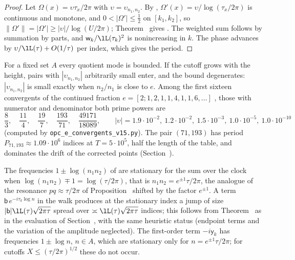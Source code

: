 \begin{proof}
Let $\Omega(x)=\upsilon\tau_x/2\pi$ with $\upsilon=\upsilon_{n_1,n_2}$. By , $\Omega'(x)=\upsilon/\log(\tau_x/2\pi)$ is continuous and monotone, and $0<|\Omega'|\le\frac12$ on $[k_1,k_2]$, so $\|\Omega'\|=|\Omega'|\ge|\upsilon|/\log(U/2\pi)$; Theorem~ gives . The weighted sum follows by summation by parts, and $\mathsf w_k/\lL(\tau_k)^2$ is nonincreasing in $k$. The phase advances by $\upsilon/\lL(\tau)+O(1/\tau)$ per index, which gives the period.
\end{proof}

For a fixed set $A$ every quotient mode is bounded. If the cutoff grows with the height, pairs with $|\upsilon_{n_1,n_2}|$ arbitrarily small enter, and the bound degenerates: $|\upsilon_{n_1,n_2}|$ is small exactly when $n_2/n_1$ is close to $e$. Among the first sixteen convergents of the continued fraction $e=[2;1,2,1,1,4,1,1,6,\dots]$ \cite{Olds1970}, those with numerator and denominator both prime powers are
\begin{equation}
\frac83,\quad\frac{11}4,\quad\frac{19}7,\quad\frac{193}{71},\quad\frac{49171}{18089},\qquad |\upsilon|=1.9\cdot10^{-2},\ 1.2\cdot10^{-2},\ 1.5\cdot10^{-3},\ 1.0\cdot10^{-5},\ 1.0\cdot10^{-10}
\label{eq:e_convergents}
\end{equation}
(computed by \texttt{opc\_e\_convergents\_v15.py}). The pair $(71,193)$ has period $P_{71,193}\approx1.09\cdot10^6$ indices at $T=5\cdot10^5$, half the length of the table, and dominates the drift of the corrected points (Section~).

\begin{remark}\label{rem:product_modes}
The frequencies $1\pm\log(n_1n_2)$ of  are stationary for the sum over the clock when $\log(n_1n_2)\mp1=\log(\tau/2\pi)$, that is $n_1n_2=e^{\pm1}\tau/2\pi$, the analogue of the resonance $pq\approx\tau/2\pi$ of Proposition~ shifted by the factor $e^{\pm1}$. A term $\mathsf b\,e^{-i\tau_k\log n}$ in the walk produces at the stationary index a jump of size $|\mathsf b|\lL(\tau)\sqrt{2\pi\tau}$ spread over $\asymp\lL(\tau)\sqrt{2\pi\tau}$ indices; this follows from Theorem~ as in the evaluation of Section~, with the same heuristic status (endpoint terms and the variation of the amplitude neglected). The first-order term $-i\mathsf y_k$ has frequencies $1\pm\log n$, $n\in A$, which are stationary only for $n=e^{\pm1}\tau/2\pi$; for cutoffs $X\le(\tau/2\pi)^{1/2}$ these do not occur.
\end{remark}

